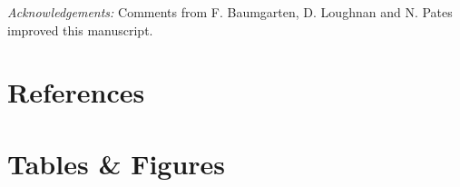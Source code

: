 \documentclass[11pt]{article}
\begin{document}
\emph{Acknowledgements:} Comments from F. Baumgarten, D. Loughnan and N. Pates improved this manuscript. 

\newpage
\section{References}
\vspace{-5ex}


\clearpage

\section{Tables \& Figures}
\end{document}
